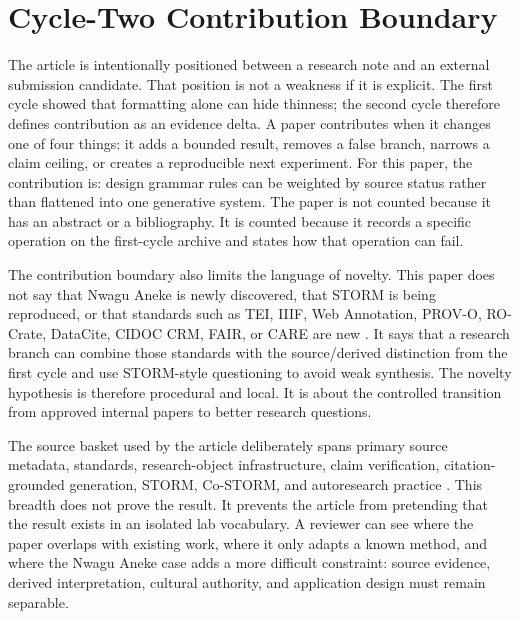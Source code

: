 \documentclass[sigconf,nonacm]{acmart}
\begin{document}
\section{Cycle-Two Contribution Boundary}
The article is intentionally positioned between a research note and an external
submission candidate. That position is not a weakness if it is explicit. The
first cycle showed that formatting alone can hide thinness; the second cycle
therefore defines contribution as an evidence delta. A paper contributes when it
changes one of four things: it adds a bounded result, removes a false branch,
narrows a claim ceiling, or creates a reproducible next experiment. For this
paper, the contribution is: design grammar rules can be weighted by source status rather than flattened into one generative system. The paper is not counted because it has an
abstract or a bibliography. It is counted because it records a specific
operation on the first-cycle archive and states how that operation can fail.

The contribution boundary also limits the language of novelty. This paper does
not say that Nwagu Aneke is newly discovered, that STORM is being reproduced, or
that standards such as TEI, IIIF, Web Annotation, PROV-O, RO-Crate, DataCite,
CIDOC CRM, FAIR, or CARE are new \cite{teiP5Glyphs,iiifPresentation3,w3cAnnotationModel,w3cAnnotationVocab,w3cProvO,rocrate12,cidocCrm,datacite45,wilkinson2016fair,carroll2020care}. It says that a research
branch can combine those standards with the source/derived distinction from the
first cycle and use STORM-style questioning to avoid weak synthesis. The novelty
hypothesis is therefore procedural and local. It is about the controlled
transition from approved internal papers to better research questions.

The source basket used by the article deliberately spans primary source
metadata, standards, research-object infrastructure, claim verification,
citation-grounded generation, STORM, Co-STORM, and autoresearch practice
\cite{azuonye1992,omniglotNwagu,unicodeAfricanScripts2023,scriptSourceNwagu,sirisNwaguProposal,teiP5Glyphs,iiifPresentation3,w3cAnnotationModel,w3cAnnotationVocab,w3cProvO,rocrate12,cidocCrm,datacite45,wilkinson2016fair,carroll2020care,wadden2020scifact,gao2023alce,karpathyAutoresearch,shao2024storm,jiang2024costorm,acmSubmissions,arxivSubmitTex}. This breadth does not prove the result. It prevents the article
from pretending that the result exists in an isolated lab vocabulary. A
reviewer can see where the paper overlaps with existing work, where it only
adapts a known method, and where the Nwagu Aneke case adds a more difficult
constraint: source evidence, derived interpretation, cultural authority, and
application design must remain separable.
\end{document}
